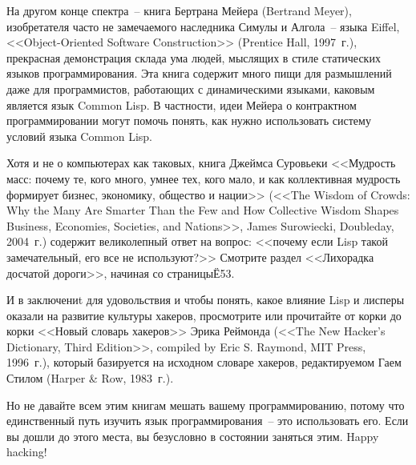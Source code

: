 На другом конце спектра~-- книга Бертрана Мейера (Bertrand Meyer), изобретателя часто не
замечаемого наследника Симулы и Алгола~-- языка Eiffel, <<Object-Oriented Software
Construction>> (Prentice Hall, 1997~г.), прекрасная демонстрация склада ума людей, мыслящих в
стиле статических языков программирования. Эта книга содержит много пищи для размышлений
даже для программистов, работающих с динамическими языками, каковым является язык Common
Lisp.  В частности, идеи Мейера о контрактном программировании могут помочь понять, как
нужно использовать систему условий языка Common Lisp.

Хотя и не о компьютерах как таковых, книга Джеймса Суровьеки <<Мудрость масс: почему те,
кого много, умнее тех, кого мало, и как коллективная мудрость формирует бизнес, экономику,
общество и нации>> (<<The Wisdom of Crowds: Why the Many Are Smarter Than the Few and How
Collective Wisdom Shapes Business, Economies, Societies, and Nations>>, James Surowiecki,
Doubleday, 2004~г.) содержит великолепный ответ на вопрос: <<почему если Lisp такой
замечательный, его все не используют?>> Смотрите раздел <<Лихорадка досчатой дороги>>,
начиная со страницыЁ53.

И в заключениt для удовольствия и чтобы понять, какое влияние Lisp и лисперы оказали на
развитие культуры хакеров, просмотрите или прочитайте от корки до корки <<Новый словарь
хакеров>> Эрика Реймонда (<<The New Hacker's Dictionary, Third Edition>>, compiled by Eric
S. Raymond, MIT Press, 1996~г.), который базируется на исходном словаре хакеров, редактируемом
Гаем Стилом (Harper \& Row, 1983~г.).

Но не давайте всем этим книгам мешать вашему программированию, потому что единственный
путь изучить язык программирования~-- это использовать его. Если вы дошли до этого места,
вы безусловно в состоянии заняться этим.  Happy hacking!


